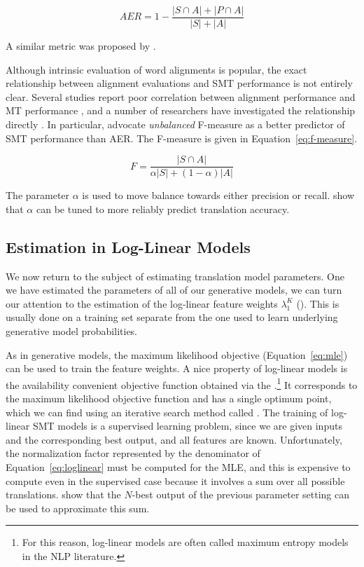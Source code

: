 \begin{equation}\label{eq:aer}
AER = 1 - \frac{|S \cap A| + | P \cap A |}{|S|+|A|}
\end{equation}

\noindent A similar metric was proposed by \citet{Ahrenberg:2000:lrec}. 

Although intrinsic evaluation of word alignments
is popular, the exact relationship
between alignment evaluations and SMT performance is not entirely clear.
Several studies report poor correlation
between alignment performance and MT performance
\citep{Koehn:2003:naacl,Callison-Burch:2004:acl,Ittycheriah:2005:hlt-emnlp},
and a number of researchers have investigated the relationship
directly \citep{Ayan:2006:acl-coling,Fraser:2007:cl,Lopez:2006:amta}.
In particular, 
\citet{Fraser:2007:cl} advocate {\em unbalanced}
F-measure as a better predictor of SMT performance 
than AER.  The F-measure is
given in Equation~\ref{eq:f-measure}.

\begin{equation}\label{eq:f-measure}
F = \frac{|S \cap A|}{\alpha|S|+(1-\alpha)|A|}
\end{equation}

\noindent The parameter $\alpha$ is used to move balance 
towards either precision or recall.  \citet{Fraser:2007:cl} show that
$\alpha$ can be tuned to more reliably 
predict translation accuracy.

\subsection{Estimation in Log-Linear Models}\label{sec:log-linear-estimation}

We now return to the subject of estimating translation model parameters.
One we have estimated the parameters of all of our generative
models, we can turn our attention to the estimation of the 
log-linear feature weights $\lambda_1^K$ ().
This is usually done on a training set separate from the one
used to learn underlying generative model probabilities.

As in generative models, the maximum likelihood 
objective (Equation~\ref{eq:mle}) 
can be used to train the feature weights.  
A nice property of log-linear models is the availability
convenient objective function obtained via
the  \citep{Berger:1996:cl}.\footnote{
For this reason, log-linear models are often called 
maximum entropy models in the NLP literature.}
It corresponds to the maximum
likelihood objective function and has a single
optimum point, which we can find using an iterative search
method called  
\citep{Darroch:1972:ams}.  The training of
log-linear SMT models is a supervised learning problem, since
we are given inputs and the corresponding best output, and
all features are known.
Unfortunately, the normalization factor represented 
by the denominator of Equation~\ref{eq:loglinear} must be 
computed for the MLE, and this is expensive to compute even
in the supervised case because it involves a sum over all
possible translations. \citet{Och:2002:acl} show that
the $N$-best output of the previous parameter setting can be used to
approximate this sum.

